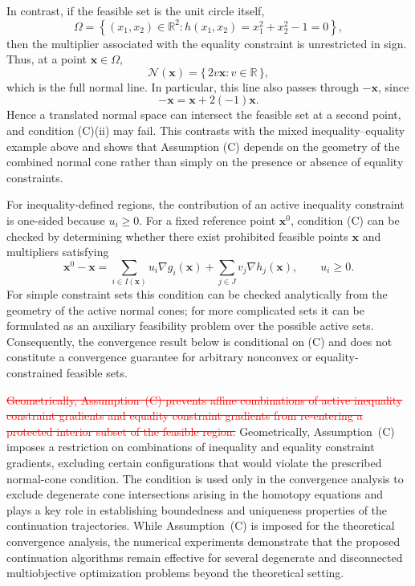 \documentclass[11pt,pdflatex,sn-mathphys-ay]{sn-jnl}%
\theoremstyle{definition}
\theoremstyle{thmstyleone}%
\theoremstyle{thmstyletwo}%
\theoremstyle{thmstylethree}%
\newcommand{\del}[1]{\textcolor{red}{\sout{#1}}}
\newcommand{\add}[1]{\textcolor{revisionblue}{#1}}
\begin{document}
	\add{
		In contrast, if the feasible set is the unit circle itself,
		\[
		\Omega
		=
		\left\{
		(x_1,x_2)\in\mathbb{R}^2:
		h(x_1,x_2)=x_1^2+x_2^2-1=0
		\right\},
		\]
		then the multiplier associated with the equality constraint is
		unrestricted in sign. Thus, at a point $\bm{x}\in\Omega$,
		\[
		\mathcal N(\bm{x})
		=
		\{\,2v\bm{x}:v\in\mathbb{R}\,\},
		\]
		which is the full normal line. In particular, this line also passes
		through $-\bm{x}$, since
		\[
		-\bm{x}
		=
		\bm{x}+2(-1)\bm{x}.
		\]
		Hence a translated normal space can intersect the feasible set at a
		second point, and condition (C)(ii) may fail. This contrasts with the
		mixed inequality--equality example above and shows that Assumption (C)
		depends on the geometry of the combined normal cone rather than simply
		on the presence or absence of equality constraints.
	}
	
	\add{For inequality-defined regions, the contribution of an active
		inequality constraint is one-sided because $u_i\geq0$. For a fixed
		reference point $\bm{x}^0$, condition (C) can be checked by determining
		whether there exist prohibited feasible points $\bm{x}$ and
		multipliers satisfying
		\[
		\bm{x}^0-\bm{x}
		=
		\sum_{i\in I(\bm{x})}u_i\nabla g_i(\bm{x})
		+
		\sum_{j\in J}v_j\nabla h_j(\bm{x}),
		\qquad u_i\geq0.
		\]
		For simple constraint sets this condition can be checked analytically
		from the geometry of the active normal cones; for more complicated
		sets it can be formulated as an auxiliary feasibility problem over
		the possible active sets. Consequently, the convergence result below
		is conditional on (C) and does not constitute a convergence guarantee
		for arbitrary nonconvex or equality-constrained feasible sets.}
	
	\del{Geometrically, Assumption~(C) prevents affine combinations
		of active inequality constraint gradients and equality
		constraint gradients from re-entering a protected interior
		subset of the feasible region.}
	\add{Geometrically, Assumption~(C) imposes a restriction
		on combinations of inequality and equality constraint
		gradients, excluding certain configurations that would
		violate the prescribed normal-cone condition.} The condition is used only in the convergence analysis to exclude degenerate cone intersections arising in the homotopy equations and plays a key role in establishing boundedness and uniqueness properties of the continuation trajectories. While Assumption~(C) is imposed for the theoretical convergence analysis, the numerical experiments demonstrate that the proposed continuation algorithms remain effective for several degenerate and disconnected multiobjective optimization problems beyond the theoretical setting.
	
\end{document}
